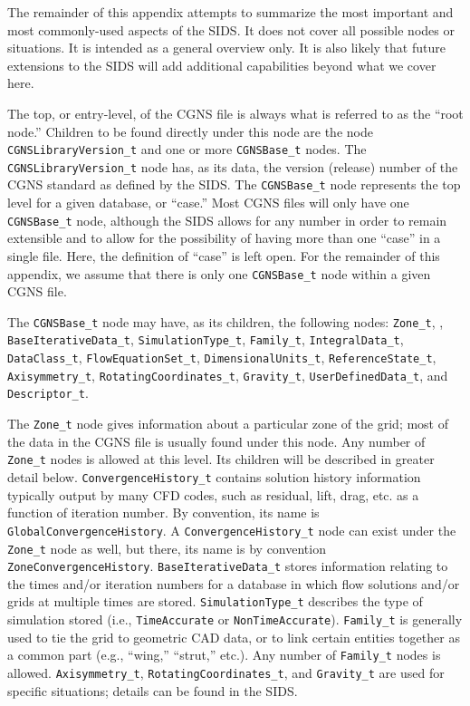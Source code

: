 \documentclass[12pt]{article}
\begin{document}
The remainder of this appendix attempts to summarize the most
important and most commonly-used aspects of the SIDS.  It does not
cover all possible nodes or situations.  It is intended as a 
general overview only.  It is also likely
that future extensions to the SIDS will add additional capabilities
beyond what we cover here.

The top, or entry-level, of the CGNS file is always what is 
referred to as the ``root node.''  Children to be found
directly under this node are the node {\tt CGNSLibraryVersion\_t} and
one or more {\tt CGNSBase\_t} nodes.  The {\tt CGNSLibraryVersion\_t} node
has, as its data, the version (release) number
of the CGNS standard as defined by the SIDS.
The {\tt CGNSBase\_t} node represents the top level for a given 
database, or ``case.''
Most CGNS files will only have one {\tt CGNSBase\_t} node, although
the SIDS allows for any number in order to remain extensible
and to allow for the possibility of having more than one
``case'' in a single file.  Here, the definition of ``case''
is left open.  For the remainder of this appendix, we assume that
there is only one {\tt CGNSBase\_t} node within a given CGNS file.

The {\tt CGNSBase\_t} node may have, as its children, the following
nodes:  {\tt Zone\_t}, 
, {\tt BaseIterativeData\_t}, 
{\tt SimulationType\_t}, {\tt Family\_t}, {\tt IntegralData\_t}, 
{\tt DataClass\_t}, {\tt FlowEquationSet\_t}, 
{\tt DimensionalUnits\_t}, {\tt ReferenceState\_t},
{\tt Axisymmetry\_t}, {\tt RotatingCoordinates\_t}, {\tt Gravity\_t},
{\tt UserDefinedData\_t}, and {\tt Descriptor\_t}.  

The {\tt Zone\_t} node gives information about a particular zone of
the grid; most of the data in the CGNS file is usually found 
under this node.  Any 
number of {\tt Zone\_t} nodes is allowed at this level.  Its children will 
be described in greater detail below.  {\tt ConvergenceHistory\_t}
contains solution history information typically output by many
CFD codes, such as residual, lift, drag, etc. as a function of
iteration number.  By convention, its name is
{\tt GlobalConvergenceHistory}.  A {\tt ConvergenceHistory\_t} node can exist
under the {\tt Zone\_t} node as well, but there, its name is by convention 
{\tt ZoneConvergenceHistory}.  {\tt BaseIterativeData\_t}
stores information relating to the times and/or iteration numbers
for a database in which flow solutions and/or grids at 
multiple times are stored.  {\tt SimulationType\_t}
describes the type of simulation stored (i.e., {\tt TimeAccurate} or 
{\tt NonTimeAccurate}).  {\tt Family\_t} is generally used
to tie the grid to geometric CAD data, or to link certain
entities together as a common part (e.g., ``wing,'' ``strut,''
etc.).  Any number of {\tt Family\_t} nodes is allowed.
{\tt Axisymmetry\_t}, {\tt RotatingCoordinates\_t}, and {\tt Gravity\_t}
are used for specific situations; details can be found in the SIDS.
\end{document}

